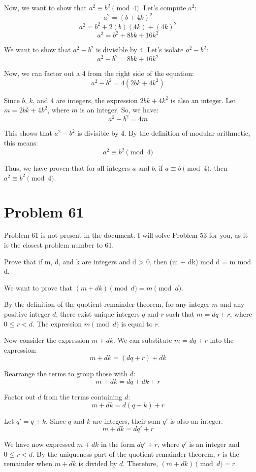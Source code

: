 \documentclass{article}
\begin{document}
Now, we want to show that $a^2 \equiv b^2 \pmod{4}$. Let's compute $a^2$:
$$a^2 = (b + 4k)^2$$
$$a^2 = b^2 + 2(b)(4k) + (4k)^2$$
$$a^2 = b^2 + 8bk + 16k^2$$

We want to show that $a^2 - b^2$ is divisible by 4. Let's isolate $a^2 - b^2$:
$$a^2 - b^2 = 8bk + 16k^2$$

Now, we can factor out a 4 from the right side of the equation:
$$a^2 - b^2 = 4(2bk + 4k^2)$$

Since $b$, $k$, and 4 are integers, the expression $2bk + 4k^2$ is also an integer. Let $m = 2bk + 4k^2$, where $m$ is an integer.
So, we have:
$$a^2 - b^2 = 4m$$

This shows that $a^2 - b^2$ is divisible by 4. By the definition of modular arithmetic, this means:
$$a^2 \equiv b^2 \pmod{4}$$

Thus, we have proven that for all integers $a$ and $b$, if $a \equiv b \pmod{4}$, then $a^2 \equiv b^2 \pmod{4}$.

\newpage

\section*{Problem 61}
Problem 61 is not present in the document. I will solve Problem 53 for you, as it is the closest problem number to 61.

Prove that if m, d, and k are integers and d > 0, then (m + dk) mod d = m mod d.

We want to prove that $(m + dk) \pmod{d} = m \pmod{d}$.

By the definition of the quotient-remainder theorem, for any integer $m$ and any positive integer $d$, there exist unique integers $q$ and $r$ such that $m = dq + r$, where $0 \le r < d$.
The expression $m \pmod{d}$ is equal to $r$.

Now consider the expression $m + dk$.
We can substitute $m = dq + r$ into the expression:
$$m + dk = (dq + r) + dk$$

Rearrange the terms to group those with $d$:
$$m + dk = dq + dk + r$$

Factor out $d$ from the terms containing $d$:
$$m + dk = d(q + k) + r$$

Let $q' = q + k$. Since $q$ and $k$ are integers, their sum $q'$ is also an integer.
$$m + dk = dq' + r$$

We have now expressed $m + dk$ in the form $dq' + r$, where $q'$ is an integer and $0 \le r < d$.
By the uniqueness part of the quotient-remainder theorem, $r$ is the remainder when $m + dk$ is divided by $d$.
Therefore, $(m + dk) \pmod{d} = r$.
\end{document}
